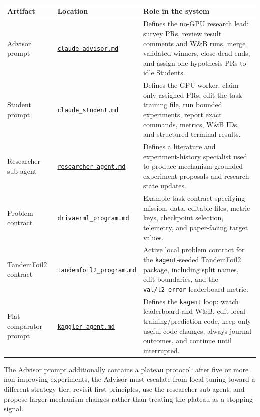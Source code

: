 \documentclass{article}
\newcommand{\appendixsourcelink}[1]{\href{https://github.com/wandb/senpai/blob/main/paper/appendix_sources/#1}{\nolinkurl{#1}}}
\begin{document}
\begin{center}
  \label{tab:instruction-source-map}
  \small
  \begin{tabular}{@{}p{}p{}p{}@{}}
    \toprule
    Artifact & Location & Role in the system \\
    \midrule
    Advisor prompt & \appendixsourcelink{claude_advisor.md} & Defines the no-GPU research lead: survey PRs, review result comments and W\&B runs, merge validated winners, close dead ends, and assign one-hypothesis PRs to idle Students. \\
    Student prompt & \appendixsourcelink{claude_student.md} & Defines the GPU worker: claim only assigned PRs, edit the task training file, run bounded experiments, report exact commands, metrics, W\&B IDs, and structured terminal results. \\
    Researcher sub-agent & \appendixsourcelink{researcher_agent.md} & Defines a literature and experiment-history specialist used to produce mechanism-grounded experiment proposals and research-state updates. \\
    Problem contract & \appendixsourcelink{drivaerml_program.md} & Example task contract specifying mission, data, editable files, metric keys, checkpoint selection, telemetry, and paper-facing target values. \\
    TandemFoil2 contract & \appendixsourcelink{tandemfoil2_program.md} & Active local problem contract for the \texttt{kagent}-seeded TandemFoil2 package, including split names, edit boundaries, and the \texttt{val/l2\_error} leaderboard metric. \\
    Flat comparator prompt & \appendixsourcelink{kaggler_agent.md} & Defines the \texttt{kagent} loop: watch leaderboard and W\&B, edit local training/prediction code, keep only useful code changes, always journal outcomes, and continue until interrupted. \\
    \bottomrule
  \end{tabular}
\end{center}

The Advisor prompt additionally contains a plateau protocol: after five or more non-improving experiments, the Advisor must escalate from local tuning toward a different strategy tier, revisit first principles, use the researcher sub-agent, and propose larger mechanism changes rather than treating the plateau as a stopping signal.
\end{document}
